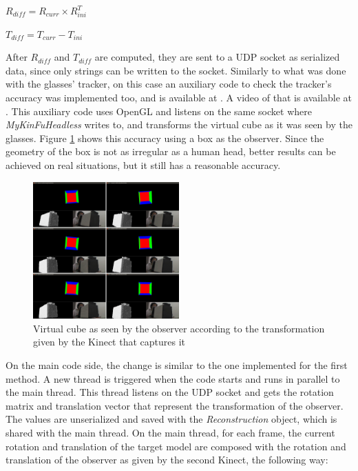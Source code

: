\documentclass[msc, a4paper, classic, en]{ufbathesis}
\begin{document}
\begin{center}
$R_{diff} = R_{curr} \times R_{ini}^T$
\end{center}

\begin{center}
$T_{diff} = T_{curr} - T_{ini}$
\end{center}

After $R_{diff}$ and $T_{diff}$ are computed, they are sent to a UDP socket as serialized data, since only strings can be written to the socket. Similarly to what was done with the glasses' tracker, on this case an auxiliary code to check the tracker's accuracy was implemented too, and is available at \cite{masterproject}. A video of that is available at \cite{videos}. This auxiliary code uses OpenGL and listens on the same socket where \textit{MyKinFuHeadless} writes to, and transforms the virtual cube as it was seen by the glasses. Figure \ref{fig:secondkinecttrack} shows this accuracy using a box as the observer. Since the geometry of the box is not as irregular as a human head, better results can be achieved on real situations, but it still has a reasonable accuracy.

\begin{figure}
\centering
  \includegraphics[width=0.5\textwidth]{images/secondkinectrack.png}
\caption{Virtual cube as seen by the observer according to the transformation given by the Kinect that captures it}
\label{fig:secondkinecttrack}
\end{figure}

On the main code side, the change is similar to the one implemented for the first method. A new thread is triggered when the code starts and runs in parallel to the main thread. This thread listens on the UDP socket and gets the rotation matrix and translation vector that represent the transformation of the observer. The values are unserialized and saved with the \textit{Reconstruction} object, which is shared with the main thread. On the main thread, for each frame, the current rotation and translation of the target model are composed with the rotation and translation of the observer as given by the second Kinect, the following way:
\end{document}
